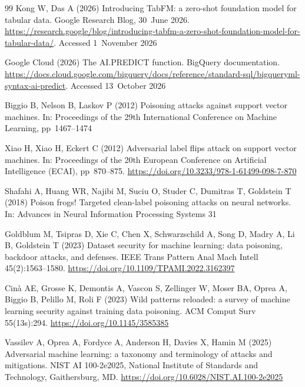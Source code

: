 \documentclass[pdflatex,sn-mathphys-num]{sn-jnl}
\begin{document}
\begin{thebibliography}{99}
Kong W, Das A (2026) Introducing TabFM: a zero-shot foundation model for tabular data. Google
Research Blog, 30~June 2026.
\url{https://research.google/blog/introducing-tabfm-a-zero-shot-foundation-model-for-tabular-data/}.
Accessed 1~November 2026

Google Cloud (2026) The AI.PREDICT function. BigQuery documentation.
\url{https://docs.cloud.google.com/bigquery/docs/reference/standard-sql/bigqueryml-syntax-ai-predict}.
Accessed 13~October 2026

Biggio B, Nelson B, Laskov P (2012) Poisoning attacks against support vector machines. In:
Proceedings of the 29th International Conference on Machine Learning, pp~1467--1474

Xiao H, Xiao H, Eckert C (2012) Adversarial label flips attack on support vector machines. In:
Proceedings of the 20th European Conference on Artificial Intelligence (ECAI), pp~870--875. \url{https://doi.org/10.3233/978-1-61499-098-7-870}

Shafahi A, Huang WR, Najibi M, Suciu O, Studer C, Dumitras T, Goldstein T (2018) Poison frogs!
Targeted clean-label poisoning attacks on neural networks. In: Advances in Neural Information
Processing Systems 31

Goldblum M, Tsipras D, Xie C, Chen X, Schwarzschild A, Song D, Madry A, Li B, Goldstein T (2023)
Dataset security for machine learning: data poisoning, backdoor attacks, and defenses. IEEE Trans
Pattern Anal Mach Intell 45(2):1563--1580. \url{https://doi.org/10.1109/TPAMI.2022.3162397}

Cinà AE, Grosse K, Demontis A, Vascon S, Zellinger W, Moser BA, Oprea A, Biggio B, Pelillo M, Roli F
(2023) Wild patterns reloaded: a survey of machine learning security against training data
poisoning. ACM Comput Surv 55(13s):294. \url{https://doi.org/10.1145/3585385}

Vassilev A, Oprea A, Fordyce A, Anderson H, Davies X, Hamin M (2025) Adversarial machine learning:
a taxonomy and terminology of attacks and mitigations. NIST AI 100-2e2025, National Institute of
Standards and Technology, Gaithersburg, MD. \url{https://doi.org/10.6028/NIST.AI.100-2e2025}


\end{thebibliography}
\end{document}
